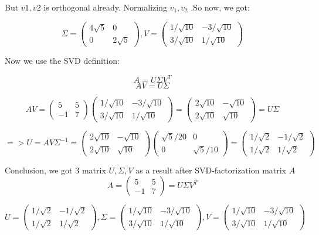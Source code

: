 \documentclass[a4paper, 12pt]{report}
\begin{document}
\indent \par But $v1,v2$ is orthogonal already. Normalizing $v_1, v_2$ .So now, we got:

$$ \Sigma = \begin{pmatrix} 4\sqrt{5}& 0 \\ 0 & 2\sqrt{5} \end{pmatrix} ,
V = \begin{pmatrix} 1/\sqrt{10} & -3/\sqrt{10} \\ 3/\sqrt{10} & 1/\sqrt{10} \end{pmatrix} $$

\indent \par Now we use the SVD definition:

$$ A = U \Sigma V^T $$
$$ AV = U \Sigma $$

$$ AV = \begin{pmatrix} 5 & 5 \\ -1 & 7 \end{pmatrix} 
\begin{pmatrix} 1/\sqrt{10} & -3/\sqrt{10} \\ 3/\sqrt{10} & 1/\sqrt{10} \end{pmatrix} =  \begin{pmatrix} 2\sqrt{10} & -\sqrt{10} \\ 2\sqrt{10} & \sqrt{10} \end{pmatrix} = U \Sigma$$

$$=> U = AV\Sigma^{-1}=  \begin{pmatrix} 2\sqrt{10} & -\sqrt{10} \\ 2\sqrt{10} & \sqrt{10} \end{pmatrix}
 \begin{pmatrix} \sqrt{5}/20 & 0 \\ 0 & \sqrt{5}/10 \end{pmatrix} =
 \begin{pmatrix} 1/\sqrt{2} & -1/\sqrt{2} \\ 1/\sqrt{2} & 1/\sqrt{2} \end{pmatrix}
  $$

\indent \par Conclusion, we got 3 matrix $U, \Sigma, V$ as a result after SVD-factorization matrix $A$
$$A = \begin{pmatrix} 5 & 5 \\ -1 & 7 \end{pmatrix} = U\Sigma V^T $$

$$U = \begin{pmatrix} 1/\sqrt{2} & -1/\sqrt{2} \\ 1/\sqrt{2} & 1/\sqrt{2} \end{pmatrix}
, \Sigma = \begin{pmatrix} 1/\sqrt{10} & -3/\sqrt{10} \\ 3/\sqrt{10} & 1/\sqrt{10} \end{pmatrix}
, V =\begin{pmatrix} 1/\sqrt{10} & -3/\sqrt{10} \\ 3/\sqrt{10} & 1/\sqrt{10} \end{pmatrix} 
$$
\end{document}

